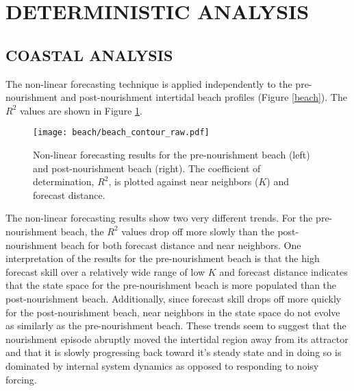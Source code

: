 \newpage
\section{DETERMINISTIC ANALYSIS}


\subsection{COASTAL ANALYSIS}

The non-linear forecasting technique is applied independently to the pre-nourishment and post-nourishment intertidal beach profiles (Figure \ref{beach}). The $R^2$ values are shown in Figure \ref{beach_contour_raw}.

\begin{figure}[htbp] %
   \centering
   \texttt{[image: beach/beach\_contour\_raw.pdf]} 
   \caption{Non-linear forecasting results for the pre-nourishment beach (left) and post-nourishment beach (right). The coefficient of determination, $R^2$, is plotted against near neighbors ($K$) and forecast distance.}
   \label{beach_contour_raw}
\end{figure}


The non-linear forecasting results show two very different trends. For the pre-nourishment beach, the $R^2$ values drop off more slowly than the post-nourishment beach for both forecast distance and near neighbors. One interpretation of the results for the pre-nourishment beach is that the high forecast skill over a relatively wide range of low $K$ and forecast distance indicates that the state space for the pre-nourishment beach is more populated than the post-nourishment beach.  Additionally, since forecast skill drops off more quickly for the post-nourishment beach, near neighbors in the state space do not evolve as similarly as the pre-nourishment beach. These trends seem to suggest that the nourishment episode abruptly moved the intertidal region away from its attractor and that it is slowly progressing back toward it's steady state and in doing so is dominated by internal system dynamics as opposed to responding to noisy forcing.




